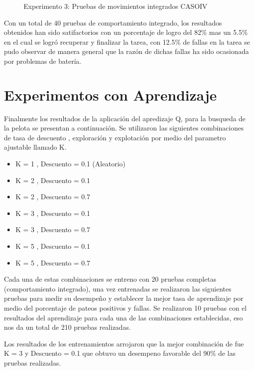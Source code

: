\begin{figure}
\caption{Experimento 3: Pruebas de movimientos integrados CASOIV}
\end{figure} 

Con un total de 40 pruebas de comportamiento integrado, los resultados obtenidos han sido satifactorios con un porcentaje de logro del 82\% mas un 5.5\% en el cual se logró recuperar y finalizar la tarea, con 12.5\% de fallas en la tarea se pudo observar de manera general que la razón de dichas fallas ha sido ocasionada por problemas de batería. 

\section{Experimentos con Aprendizaje}\label{sec:experimentosAprend}

Finalmente los resultados de la aplicaci\'on del apredizaje Q, para la busqueda de la pelota se presentan a continuaci\'on.
Se utilizaron las siguientes combinaciones de tasa de descuento , exploraci\'on y explotaci\'on por medio del parametro ajustable llamado K.

\begin{itemize}
\item K = 1 , Descuento = 0.1 (Aleatorio)
\item K = 2 , Descuento = 0.1 
\item K = 2 , Descuento = 0.7
\item K = 3 , Descuento = 0.1
\item K = 3 , Descuento = 0.7
\item K = 5 , Descuento = 0.1
\item K = 5 , Descuento = 0.7
   
\end{itemize}

Cada una de estas combinaciones se entreno con 20 pruebas completas (comportamiento integrado), una vez entrenadas se realizaron las siguientes pruebas para medir su desempeño y establecer la mejor tasa de aprendizaje por medio del porcentaje de pateos positivos y fallas. Se realizaron 10 pruebas con el resultados del aprendizaje para cada una de las combinaciones establecidas, eso nos da un total de 210 pruebas realizadas. 

Los resultados de los entrenamientos arrojaron que la mejor combinaci\'on de fue K = 3 y Descuento = 0.1 que obtuvo un desempeno favorable del 90\% de las pruebas realizadas.

